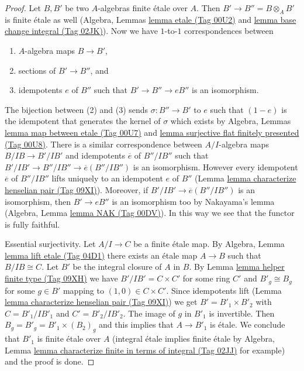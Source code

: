 \documentclass{amsart}
\theoremstyle{plain}
\theoremstyle{definition}
\theoremstyle{remark}
\numberwithin{equation}{subsection}
\begin{document}
\begin{proof}
Let $B, B'$ be two $A$-algebras finite \'etale over $A$.
Then $B' \to B'' = B \otimes_A B'$ is finite \'etale as well
(Algebra, Lemmas \href{https://stacks.math.columbia.edu/tag/00U2}{lemma etale (Tag 00U2)} and
\href{https://stacks.math.columbia.edu/tag/02JK}{lemma base change integral (Tag 02JK)}).
Now we have $1$-to-$1$ correspondences between
\begin{enumerate}
\item $A$-algebra maps $B \to B'$,
\item sections of $B' \to B''$, and
\item idempotents $e$ of $B''$ such that $B' \to B'' \to eB''$ is
an isomorphism.
\end{enumerate}
The bijection between (2) and (3) sends $\sigma : B'' \to B'$
to $e$ such that $(1 - e)$ is the idempotent
that generates the kernel of $\sigma$ which exists by
Algebra, Lemmas \href{https://stacks.math.columbia.edu/tag/00U7}{lemma map between etale (Tag 00U7)} and
\href{https://stacks.math.columbia.edu/tag/00U8}{lemma surjective flat finitely presented (Tag 00U8)}.
There is a similar correspondence between
$A/I$-algebra maps $B/IB \to B'/IB'$ and idempotents
$\overline{e}$ of $B''/IB''$ such that
$B'/IB' \to B''/IB'' \to \overline{e}(B''/IB'')$ is
an isomorphism. However every idempotent $\overline{e}$ of $B''/IB''$
lifts uniquely to an idempotent $e$ of $B''$
(Lemma \href{https://stacks.math.columbia.edu/tag/09XI}{lemma characterize henselian pair (Tag 09XI)}).
Moreover, if $B'/IB' \to \overline{e}(B''/IB'')$ is an isomorphism,
then $B' \to eB''$ is an isomorphism too by Nakayama's lemma
(Algebra, Lemma \href{https://stacks.math.columbia.edu/tag/00DV}{lemma NAK (Tag 00DV)}).
In this way we see that the functor is fully faithful.

\medskip\noindent
Essential surjectivity. Let $A/I \to C$ be a finite \'etale map.
By Algebra, Lemma \href{https://stacks.math.columbia.edu/tag/04D1}{lemma lift etale (Tag 04D1)}
there exists an \'etale map $A \to B$ such that $B/IB \cong C$.
Let $B'$ be the integral closure of $A$ in $B$. 
By Lemma \href{https://stacks.math.columbia.edu/tag/09XH}{lemma helper finite type (Tag 09XH)} we have
$B'/IB' = C \times C'$ for some ring $C'$
and $B'_g \cong B_g$ for some $g \in B'$ mapping to $(1, 0) \in C \times C'$.
Since idempotents lift
(Lemma \href{https://stacks.math.columbia.edu/tag/09XI}{lemma characterize henselian pair (Tag 09XI)})
we get $B' = B'_1 \times B'_2$ with $C = B'_1/IB'_1$ and $C' = B'_2/IB'_2$.
The image of $g$ in $B'_1$ is invertible.
Then $B_g = B'_g = B'_1 \times (B_2)_g$ and this implies
that $A \to B'_1$ is \'etale.
We conclude that $B'_1$ is finite \'etale over $A$
(integral \'etale implies finite \'etale by
Algebra, Lemma \href{https://stacks.math.columbia.edu/tag/02JJ}{lemma characterize finite in terms of integral (Tag 02JJ)}
for example)
and the proof is done.
\end{proof}
\end{document}
